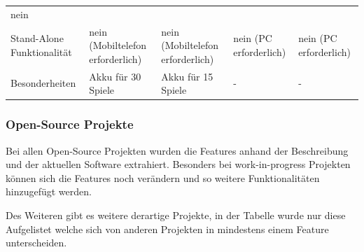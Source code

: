 \begin{longtable}[]{@{}lllll@{}}
\begin{minipage}[t]{0.13\columnwidth}
nein\strut
\end{minipage}\tabularnewline
\begin{minipage}[t]{0.18\columnwidth}\raggedright
Stand-Alone Funktionalität\strut
\end{minipage} & \begin{minipage}[t]{0.18\columnwidth}\raggedright
nein (Mobiltelefon erforderlich)\strut
\end{minipage} & \begin{minipage}[t]{0.22\columnwidth}\raggedright
nein (Mobiltelefon erforderlich)\strut
\end{minipage} & \begin{minipage}[t]{0.15\columnwidth}\raggedright
nein (PC erforderlich)\strut
\end{minipage} & \begin{minipage}[t]{0.13\columnwidth}\raggedright
nein (PC erforderlich)\strut
\end{minipage}\tabularnewline
\begin{minipage}[t]{0.18\columnwidth}\raggedright
Besonderheiten\strut
\end{minipage} & \begin{minipage}[t]{0.18\columnwidth}\raggedright
Akku für 30 Spiele\strut
\end{minipage} & \begin{minipage}[t]{0.22\columnwidth}\raggedright
Akku für 15 Spiele\strut
\end{minipage} & \begin{minipage}[t]{0.15\columnwidth}\raggedright
-\strut
\end{minipage} & \begin{minipage}[t]{0.13\columnwidth}\raggedright
-\strut
\end{minipage}\tabularnewline
\bottomrule
\end{longtable}

\hypertarget{open-source-projekte}{%
\subsubsection{Open-Source Projekte}\label{open-source-projekte}}

Bei allen Open-Source Projekten wurden die Features anhand der
Beschreibung und der aktuellen Software extrahiert. Besonders bei
work-in-progress Projekten können sich die Features noch verändern und
so weitere Funktionalitäten hinzugefügt werden.

Des Weiteren gibt es weitere derartige Projekte, in der Tabelle wurde
nur diese Aufgelistet welche sich von anderen Projekten in mindestens
einem Feature unterscheiden.

